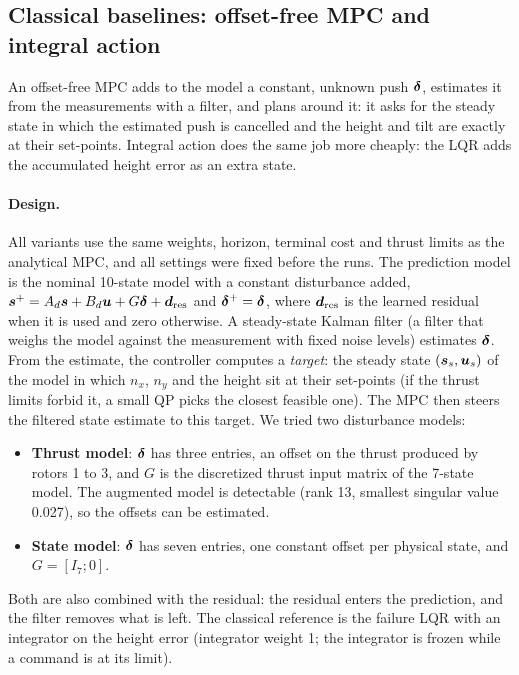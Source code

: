 \subsection{Classical baselines: offset-free MPC and integral action}\label{sec:offsetfree}
\begin{plain}
An offset-free MPC adds to the model a constant, unknown push $\boldsymbol{\delta}$, estimates it from the measurements with a filter, and plans around it: it asks for the steady state in which the estimated push is cancelled and the height and tilt are exactly at their set-points. Integral action does the same job more cheaply: the LQR adds the accumulated height error as an extra state.
\end{plain}
\paragraph{Design.} All variants use the same weights, horizon, terminal cost and thrust limits as the analytical MPC, and all settings were fixed before the runs. The prediction model is the nominal 10-state model with a constant disturbance added, $\boldsymbol{s}^+ = A_d\boldsymbol{s} + B_d\boldsymbol{u} + G\boldsymbol{\delta} + \boldsymbol{d}_{\mathrm{res}}$ and $\boldsymbol{\delta}^+ = \boldsymbol{\delta}$, where $\boldsymbol{d}_{\mathrm{res}}$ is the learned residual when it is used and zero otherwise. A steady-state Kalman filter (a filter that weighs the model against the measurement with fixed noise levels) estimates $\boldsymbol{\delta}$. From the estimate, the controller computes a \emph{target}: the steady state $(\boldsymbol{s}_s,\boldsymbol{u}_s)$ of the model in which $n_x$, $n_y$ and the height sit at their set-points (if the thrust limits forbid it, a small QP picks the closest feasible one). The MPC then steers the filtered state estimate to this target. We tried two disturbance models:
\begin{itemize}
  \item \textbf{Thrust model}: $\boldsymbol{\delta}$ has three entries, an offset on the thrust produced by rotors 1 to 3, and $G$ is the discretized thrust input matrix of the 7-state model. The augmented model is detectable (rank 13, smallest singular value 0.027), so the offsets can be estimated.
  \item \textbf{State model}: $\boldsymbol{\delta}$ has seven entries, one constant offset per physical state, and $G = [I_7;0]$.
\end{itemize}
Both are also combined with the residual: the residual enters the prediction, and the filter removes what is left. The classical reference is the failure LQR with an integrator on the height error (integrator weight 1; the integrator is frozen while a command is at its limit).

